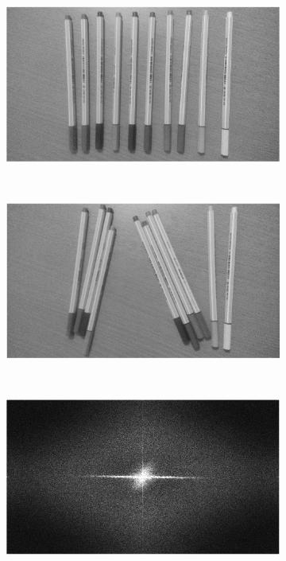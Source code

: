 \begin{figure}[h]
  \centering
  \begin{subfigure}[b]{0.45\textwidth}
    \includegraphics[width=\textwidth]{imgs/stab_1}
  \end{subfigure}%
  ~
  \begin{subfigure}[b]{0.45\textwidth}
    \includegraphics[width=\textwidth]{imgs/stab_2}
  \end{subfigure}%
  \\
  \begin{subfigure}[b]{0.45\textwidth}
    \includegraphics[width=\textwidth]{imgs/stab_1_spectra}

\end{subfigure}
\end{figure}
